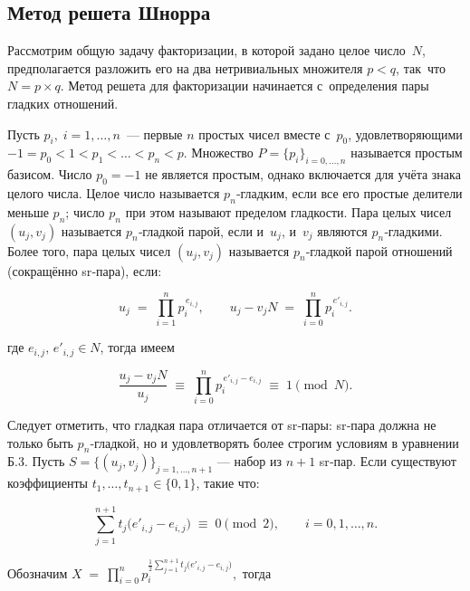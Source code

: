 
\subsection*{Метод решета Шнорра}

Рассмотрим общую задачу факторизации, в которой задано целое число $N$,
предполагается разложить его на два нетривиальных множителя $p<q$, так что $N =
p\times q$. Метод решета для факторизации начинается с определения пары гладких
отношений.

Пусть $p_i,\; i = 1,\dots,n$ — первые $n$ простых чисел вместе с $p_0$,
удовлетворяющими $-1 = p_0 < 1 < p_1 < \dots < p_n < p$. Множество $P =
\{p_i\}_{i=0,\dots,n}$ называется простым базисом. Число $p_0 = -1$ не является
простым, однако включается для учёта знака целого числа. Целое число называется
$p_n$‑гладким, если все его простые делители меньше $p_n$; число $p_n$ при этом
называют пределом гладкости. Пара целых чисел $(u_j,v_j)$ называется
$p_n$‑гладкой парой, если и $u_j$, и $v_j$ являются $p_n$‑гладкими. Более того,
пара целых чисел $(u_j,v_j)$ называется $p_n$‑гладкой парой отношений
(сокращённо sr‑пара), если:

\begin{equation}
  u_{j} \;=\; \prod_{i=1}^{n} p_{i}^{\,e_{i,j}},
  \qquad
  u_{j} - v_{j}N \;=\; \prod_{i=0}^{n} p_{i}^{\,e'_{i,j}}.
\end{equation}

где $e_{i,j},\,e'_{i,j}\in{N}$, тогда имеем

\begin{equation}
  \frac{u_{j}-v_{j}N}{u_{j}}
  \;\equiv\;
  \prod_{i=0}^{n} p_{i}^{\,e'_{i,j}-e_{i,j}}
  \;\equiv\; 1 \pmod{N}.
\end{equation}

Следует отметить, что гладкая пара отличается от sr‑пары: sr‑пара должна не
только быть $p_n$‑гладкой, но и удовлетворять более строгим условиям в
уравнении Б.3. Пусть $S=\{(u_j,v_j)\}_{j=1,\dots,n+1}$ — набор из $n\!+\!1$
sr‑пар. Если существуют коэффициенты $ t_1,\dots,t_{n+1}\in\{0,1\}$, такие что:

\begin{equation}
  \sum_{j=1}^{n+1} t_{j}\bigl(e'_{i,j}-e_{i,j}\bigr)
  \;\equiv\; 0 \pmod{2},
  \qquad i = 0,1,\dots,n.
\end{equation}

Обозначим $X \;=\ \prod_{i=0}^{n}p_{i}^{\frac12 \sum_{j=1}^{n+1} t_{j}\bigl(e'_{i,j}-e_{i,j}\bigr)},$
тогда

